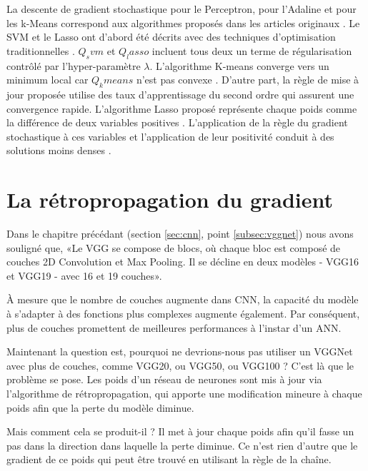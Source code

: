 	La descente de gradient stochastique pour le Perceptron, pour l'Adaline et pour les k-Means correspond aux algorithmes proposés dans les articles originaux \cite{bottou2012stochastic}. Le SVM et le Lasso ont d'abord été décrits avec des techniques d'optimisation traditionnelles \cite{bottou2018optimization}. $Q_svm$ et $Q_lasso$ incluent tous deux un terme de régularisation contrôlé par l'hyper-paramètre $\lambda$. L'algorithme K-means converge vers un minimum local car $Q_kmeans$ n'est pas convexe \cite{bottou2012stochastic}. D'autre part, la règle de mise à jour proposée utilise des taux d'apprentissage du second ordre qui assurent une convergence rapide. L'algorithme Lasso proposé représente chaque poids comme la différence de deux variables positives \cite{bottou2010large}. L'application de la règle du gradient stochastique à ces variables et l'application de leur positivité conduit à des solutions moins denses \cite{bottou2012stochastic}.
	
	
	
	
	
	\section{La rétropropagation du gradient}\label{sec:backprop}
	
	
	
	Dans le chapitre précédant (section \ref{sec:cnn}, point \ref{subsec:vggnet}) nous avons souligné que, «{Le VGG se compose de blocs, où chaque bloc est composé de couches 2D Convolution et Max Pooling. Il se décline en deux modèles - VGG16 et VGG19 - avec 16 et 19 couches}».
	
	À mesure que le nombre de couches augmente dans CNN, la capacité du modèle à s'adapter à des fonctions plus complexes augmente également. Par conséquent, plus de couches promettent de meilleures performances à l'instar d'un ANN.
	
	Maintenant la question est, pourquoi ne devrions-nous pas utiliser un VGGNet avec plus de couches, comme VGG20, ou VGG50, ou VGG100 ? C'est là que le problème se pose. Les poids d'un réseau de neurones sont mis à jour via l'algorithme de rétropropagation, qui apporte une modification mineure à chaque poids afin que la perte du modèle diminue.
	
	Mais comment cela se produit-il ? Il met à jour chaque poids afin qu'il fasse un pas dans la direction dans laquelle la perte diminue. Ce n'est rien d'autre que le gradient de ce poids qui peut être trouvé en utilisant la règle de la chaîne.
	

